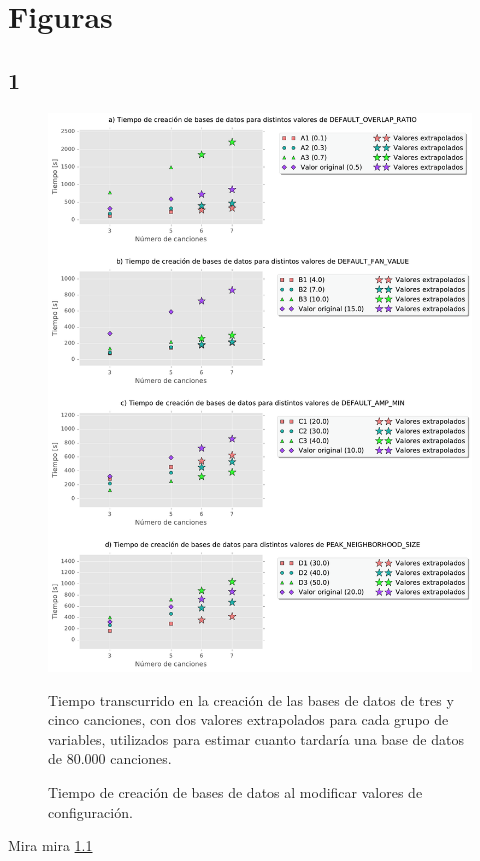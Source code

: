 
\chapter{Figuras}

\section{1}

%








\begin{figure}[h]
    \centering
    \includegraphics[scale=0.6]{graficos/AnalisisTest35Canciones.pdf}
    \caption{Tiempo de creación de bases de datos al modificar valores de configuración.}{Tiempo transcurrido en la creación de las bases de datos de tres y cinco canciones, con dos valores extrapolados para cada grupo de variables, utilizados para estimar cuanto tardaría una base de datos de 80.000 canciones.}
    \label{fig:AnalisisTest35Canciones}
\end{figure}
Mira mira \ref{fig:AnalisisTest35Canciones}

